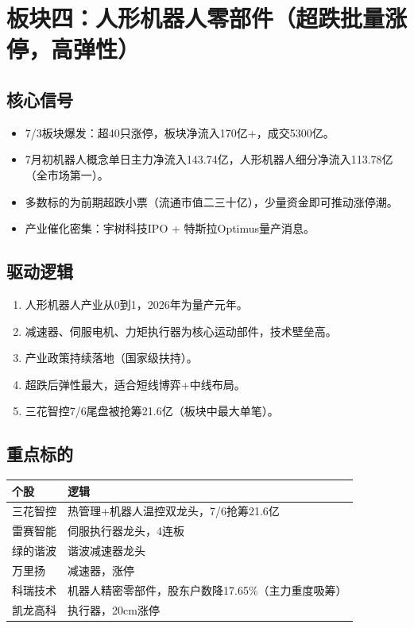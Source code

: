 \documentclass[a4paper,11pt,fontset=none]{ctexart}
\begin{document}
\section{板块四：人形机器人零部件（超跌批量涨停，高弹性）}

\subsection*{核心信号}
\begin{itemize}
  \item 7/3板块爆发：超40只涨停，板块净流入170亿+，成交5300亿。
  \item 7月初机器人概念单日主力净流入143.74亿，人形机器人细分净流入113.78亿（全市场第一）。
  \item 多数标的为前期超跌小票（流通市值二三十亿），少量资金即可推动涨停潮。
  \item 产业催化密集：宇树科技IPO + 特斯拉Optimus量产消息。
\end{itemize}

\subsection*{驱动逻辑}
\begin{enumerate}
  \item 人形机器人产业从0到1，2026年为量产元年。
  \item 减速器、伺服电机、力矩执行器为核心运动部件，技术壁垒高。
  \item 产业政策持续落地（国家级扶持）。
  \item 超跌后弹性最大，适合短线博弈+中线布局。
  \item 三花智控7/6尾盘被抢筹21.6亿（板块中最大单笔）。
\end{enumerate}

\subsection*{重点标的}
\begin{tabularx}{\textwidth}{L{3cm}X}
\toprule
\textbf{个股} & \textbf{逻辑} \\
\midrule
三花智控 & 热管理+机器人温控双龙头，7/6抢筹21.6亿 \\
雷赛智能 & 伺服执行器龙头，4连板 \\
绿的谐波 & 谐波减速器龙头 \\
万里扬 & 减速器，涨停 \\
科瑞技术 & 机器人精密零部件，股东户数降17.65\%（主力重度吸筹） \\
凯龙高科 & 执行器，20cm涨停 \\
\bottomrule
\end{tabularx}
\end{document}
